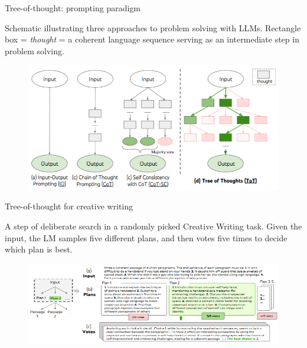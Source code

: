 
\begin{vbframe}{Tree-of-thought: prompting paradigm}

\vfill

Schematic illustrating three approaches to problem solving
with LLMs. Rectangle box = \textit{thought} = a coherent language sequence serving as an intermediate step in problem solving.

\begin{figure}
    \centering
    \includegraphics{figure/tot_vs_cot.png}\\
\end{figure}

\vfill

\end{vbframe}



\begin{vbframe}{Tree-of-thought for creative writing}

\vfill

A step of deliberate search in a randomly picked Creative Writing task. Given the input, the LM samples five different plans, and then votes five times to decide which plan is best.
    
\begin{figure}
    \centering
    \includegraphics{figure/tot_creative_writing.png}\\
\end{figure}

\vfill

\end{vbframe}

